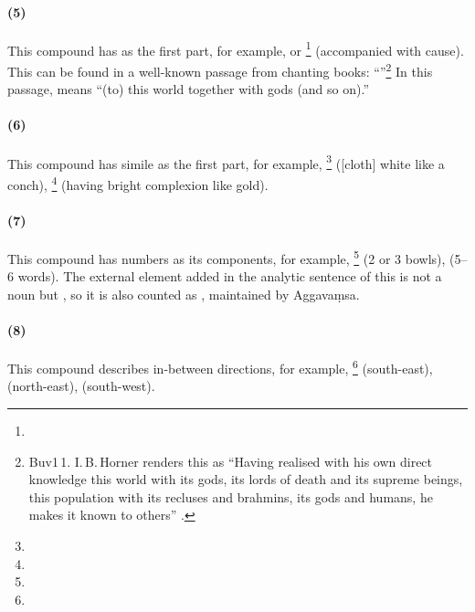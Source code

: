 \paragraph*{(5) }\label{par:sahapubba} This compound has  as the first part, for example,  or \footnote{} (accompanied with cause). This can be found in a well-known passage from chanting books: ``''\footnote{Buv1\,1. I.\,B.\,Horner renders this as ``Having realised with his own direct knowledge this world with its gods, its lords of death and its supreme beings, this population with its recluses and brahmins, its gods and humans, he makes it known to others'' \citep[pp.~84--5]{horner:discipline}.} In this passage,  means ``(to) this world together with gods (and so on).''

\paragraph*{(6) } This compound has simile as the first part, for example, \footnote{} ([cloth] white like a conch), \footnote{} (having bright complexion like gold).

\paragraph*{(7) } This compound has numbers as its components, for example, \footnote{} (2 or 3 bowls),  (5--6 words). The external element added in the analytic sentence of this is not a noun but , so it is also counted as , maintained by Aggava\d msa.

\paragraph*{(8) } This compound describes in-bet\-ween directions, for example, \footnote{} (south-east),  (north-east),  (south-west).

